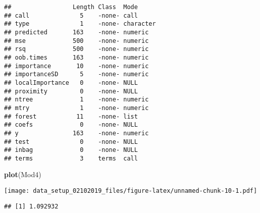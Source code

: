 \documentclass[]{article}
\newenvironment{Shaded}{\begin{snugshade}}{\end{snugshade}}
\newcommand{\KeywordTok}[1]{\textcolor[rgb]{0.13,0.29,0.53}{\textbf{{#1}}}}
\newcommand{\DataTypeTok}[1]{\textcolor[rgb]{0.13,0.29,0.53}{{#1}}}
\newcommand{\DecValTok}[1]{\textcolor[rgb]{0.00,0.00,0.81}{{#1}}}
\newcommand{\FloatTok}[1]{\textcolor[rgb]{0.00,0.00,0.81}{{#1}}}
\newcommand{\StringTok}[1]{\textcolor[rgb]{0.31,0.60,0.02}{{#1}}}
\newcommand{\CommentTok}[1]{\textcolor[rgb]{0.56,0.35,0.01}{\textit{{#1}}}}
\newcommand{\OtherTok}[1]{\textcolor[rgb]{0.56,0.35,0.01}{{#1}}}
\newcommand{\NormalTok}[1]{{#1}}
\begin{document}
\begin{verbatim}
##                 Length Class  Mode     
## call              5    -none- call     
## type              1    -none- character
## predicted       163    -none- numeric  
## mse             500    -none- numeric  
## rsq             500    -none- numeric  
## oob.times       163    -none- numeric  
## importance       10    -none- numeric  
## importanceSD      5    -none- numeric  
## localImportance   0    -none- NULL     
## proximity         0    -none- NULL     
## ntree             1    -none- numeric  
## mtry              1    -none- numeric  
## forest           11    -none- list     
## coefs             0    -none- NULL     
## y               163    -none- numeric  
## test              0    -none- NULL     
## inbag             0    -none- NULL     
## terms             3    terms  call
\end{verbatim}

\begin{Shaded}
\begin{Highlighting}[]
\KeywordTok{plot}\NormalTok{(Mod4)}
\end{Highlighting}
\end{Shaded}

\texttt{[image: data\_setup\_02102019\_files/figure-latex/unnamed-chunk-10-1.pdf]}

\begin{Shaded}
\end{Shaded}

\begin{verbatim}
## [1] 1.092932
\end{verbatim}

\begin{Shaded}
\end{Shaded}
\end{document}
